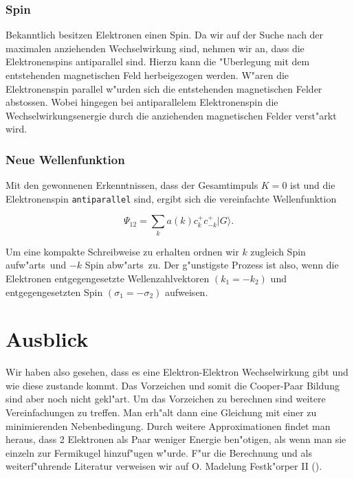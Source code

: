 \begin{refsection}
\subsubsection{Spin}
Bekanntlich besitzen Elektronen einen Spin.
Da wir auf der Suche nach der maximalen anziehenden Wechselwirkung sind, nehmen wir an,
dass die Elektronenspins antiparallel sind.
Hierzu kann die "Uberlegung mit dem entstehenden magnetischen Feld herbeigezogen werden.
W"aren die Elektronenspin parallel w"urden sich die entstehenden magnetischen Felder abstossen.
Wobei hingegen bei antiparallelem Elektronenspin die Wechselwirkungsenergie durch die
anziehenden magnetischen Felder verst"arkt wird.

\subsubsection{Neue Wellenfunktion}
Mit den gewonnenen Erkenntnissen, dass der Gesamtimpuls $K=0$ ist und die Elektronenspin
\texttt{antiparallel} sind, ergibt sich die vereinfachte Wellenfunktion

\[
\Psi_{12}=\sum \limits_{k} a(k)c^+_{k}c^+_{-k}|G\rangle.
\]

Um eine kompakte Schreibweise zu erhalten ordnen wir $k$ zugleich \glqq Spin
aufw"arts\grqq~und $-k$ \glqq Spin abw"arts\grqq~zu.
Der g"unstigste Prozess ist also, wenn die Elektronen entgegengesetzte
Wellenzahlvektoren $(k_1 = -k_2)$ und entgegengesetzten Spin $(\sigma_1 = -\sigma_2)$ aufweisen.

\section{Ausblick}
Wir haben also gesehen, dass es eine Elektron-Elektron Wechselwirkung gibt und wie diese zustande kommt.
Das Vorzeichen und somit die Cooper-Paar Bildung sind aber noch nicht gekl"art.
Um das Vorzeichen zu berechnen sind weitere Vereinfachungen zu treffen.
Man erh"alt dann eine Gleichung mit einer zu minimierenden Nebenbedingung.
Durch weitere Approximationen findet man heraus,
dass 2 Elektronen als Paar weniger Energie ben"otigen, als wenn man sie einzeln zur Fermikugel
hinzuf"ugen w"urde.
F"ur die Berechnung und als weiterf"uhrende Literatur verweisen wir auf
O. Madelung Festk"orper II (\cite{supraleitung:madelung1}).


\printbibliography[heading=subbibliography]
\end{refsection}